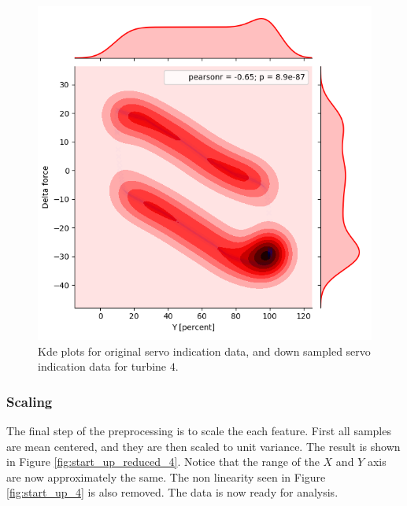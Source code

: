 \begin{figure}[h]
\begin{minipage}[b]{0.5\linewidth}
                    \includegraphics[width=1\linewidth]{figures/data/kdePlot_reduced_Servo_A4.png} 
                \end{minipage} 
                \caption{Kde plots for original servo indication data, and down sampled servo indication data for turbine $4$.}
                \label{fig:kde_servo}
            \end{figure}

        \subsubsection{Scaling}
            The final step of the preprocessing is to scale the each feature. First all samples are mean centered, and they are then scaled to unit variance. The result is shown in Figure \ref{fig:start_up_reduced_4}. Notice that the range of the $X$ and $Y$ axis are now approximately the same. The non linearity seen in Figure \ref{fig:start_up_4} is also removed. The data is now ready for analysis.     
            
            
        
